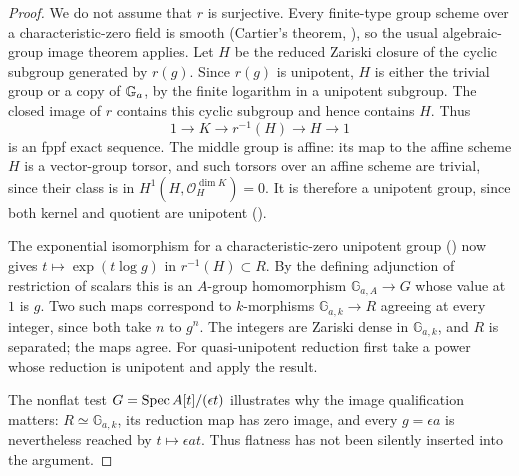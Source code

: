 \begin{proof}
We do not assume that $r$ is surjective. Every
finite-type group scheme over a characteristic-zero
field is smooth (Cartier's theorem,
\citealp[Lemma 39.8.2, Tag 047N]{D_StacksCartier}),
so the usual algebraic-group image theorem applies.
Let $H$ be the reduced Zariski closure of the
cyclic subgroup generated by $r(g)$. Since $r(g)$
is unipotent, $H$ is either the trivial group or
a copy of $\mathbb G_a$, by the finite logarithm in a
unipotent subgroup. The closed image of $r$
contains this cyclic subgroup and hence contains
$H$. Thus
\[
 1\longrightarrow K\longrightarrow r^{-1}(H)
           \longrightarrow H\longrightarrow1
\]
is an fppf exact sequence. The middle group is
affine: its map to the affine scheme $H$ is a
vector-group torsor, and such torsors over an
affine scheme are trivial, since their class is
in $H^1(H,\mathcal O_H^{\dim K})=0$.
It is therefore a unipotent group, since both
kernel and quotient are unipotent
(\citealp[Corollary 14.7]{D_Milne2022}).

The exponential isomorphism for a characteristic-zero
unipotent group
(\citealp[Proposition 14.32]{D_Milne2022}) now gives
$t\mapsto\exp(t\log g)$ in $r^{-1}(H)\subset R$.
By the defining adjunction of restriction of scalars
this is an $A$-group homomorphism $\mathbb G_{a,A}\to G$
whose value at $1$ is $g$.
Two such maps correspond to $k$-morphisms
$\mathbb G_{a,k}\to R$ agreeing at every integer, since both
take $n$ to $g^n$. The integers are Zariski dense
in $\mathbb G_{a,k}$, and $R$ is separated; the maps agree.
For quasi-unipotent reduction first take a power
whose reduction is unipotent and apply the result.

The nonflat test $G=\operatorname{Spec} A[t]/(\epsilon t)$
illustrates why the image qualification matters:
$R\simeq\mathbb G_{a,k}$, its reduction map has zero image,
and every $g=\epsilon a$ is nevertheless reached
by $t\mapsto\epsilon at$. Thus flatness has not
been silently inserted into the argument.
\end{proof}
